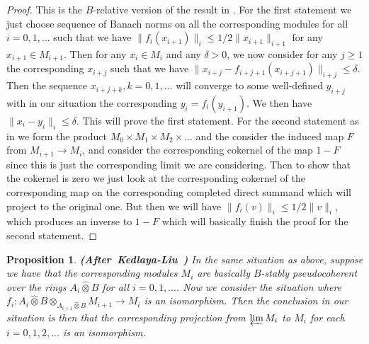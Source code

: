 \documentclass[12pt]{amsart}
\newtheorem{proposition}[theorem]{Proposition}
\theoremstyle{definition}
\numberwithin{equation}{section}
\begin{document}
\begin{proof}
This is the $B$-relative version of the result in \cite[Lemma 2.6.3]{KL2}. For the first statement we just choose sequence of Banach norms on all the corresponding modules for all $i=0,1,...$ such that we have $\|f_i(x_{i+1})\|_i\leq 1/2\|x_{i+1}\|_{i+1}$ for any $x_{i+1}\in M_{i+1}$. Then for any $x_i\in M_i$ and any $\delta>0$, we now consider for any $j\geq 1$ the corresponding $x_{i+j}$ such that we have $\|x_{i+j}-f_{i+j+1}(x_{i+j+1})\|_{i+j}\leq \delta$. Then the sequence $x_{i+j+k},k=0,1,...$ will converge to some well-defined $y_{i+j}$ with in our situation the corresponding $y_{i}=f_{i}(y_{i+1})$. We then have $\|x_i-y_i\|_i\leq \delta$. This will prove the first statement. For the second statement as in \cite[Lemma 2.6.3]{KL2} we form the product $M_0\times M_1\times M_2\times...$ and the consider the induced map $F$ from $M_{i+1}\rightarrow M_i$, and consider the corresponding cokernel of the map $1-F$ since this is just the corresponding limit we are considering. Then to show that the cokernel is zero we just look at the corresponding cokernel of the corresponding map on the corresponding completed direct summand which will project to the original one. But then we will have $\|f_i(v)\|_i\leq 1/2 \|v\|_i$, which produces an inverse to $1-F$ which will basically finish the proof for the second statement. 	
\end{proof}


\begin{proposition} \mbox{\bf{(After Kedlaya-Liu \cite[Lemma 2.6.4]{KL2})}} In the same situation as above, suppose we have that the corresponding modules $M_i$ are basically $B$-stably pseudocoherent over the rings $A_i\widehat{\otimes}B$ for all $i=0,1,...$. Now we consider the situation where $f_i:A_i\widehat{\otimes}B\otimes_{A_{i+1}\widehat{\otimes}B}M_{i+1}\rightarrow M_i$ is an isomorphism. Then the conclusion in our situation is then that the corresponding projection from $\varprojlim M_i$ to $M_i$ for each $i=0,1,2,...$ is an isomorphism. 

	
\end{proposition}
\end{document}
